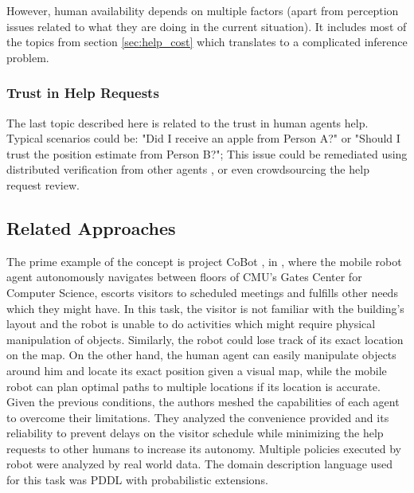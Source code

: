 However, human availability depends on multiple factors (apart from perception
issues related to what they are doing in the current situation). It includes
most of the topics from section \ref{sec:help_cost} which translates to a
complicated inference problem.

\subsubsection{Trust in Help Requests}
The last topic described here is related to the trust in human agents help.
Typical scenarios could be: "Did I receive an apple from Person A?" or "Should I
trust the position estimate from Person B?";
This issue could be remediated using distributed verification from other agents
\cite{rosenthal2012someone}, or even crowdsourcing the help request review.

\subsection{Related Approaches}

The prime example of the concept is project CoBot \cite{veloso2015cobots}, in
\cite{rosenthal2010effective}, where the
mobile robot agent autonomously navigates between floors of \gls{CMU}'s
Gates Center for Computer Science, escorts visitors to scheduled meetings and
fulfills other needs which they might have. In this task, the visitor is not
familiar with the building's layout and the robot is unable to do activities
which might require physical manipulation of objects. Similarly, the robot could lose track of its exact
location on the map. On the other hand, the human agent can easily manipulate
objects around him and locate its exact position given a visual map, while the
mobile robot can plan optimal paths to multiple locations if its location is
accurate.
Given the previous conditions, the authors meshed the capabilities of each agent
to overcome their limitations.
They analyzed the convenience provided and its reliability to prevent delays on
the visitor schedule while minimizing the help requests to other humans to increase
its autonomy. Multiple policies executed by robot were analyzed by real world
data.
The domain description language used for this task was \gls{PDDL} with
probabilistic extensions.

